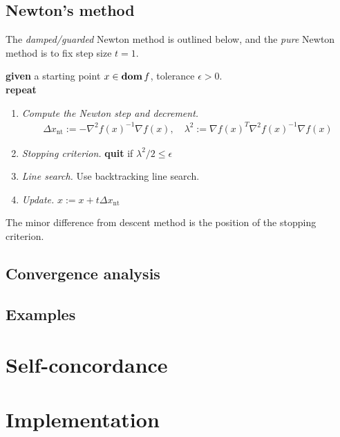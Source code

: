 \subsection{Newton's method}
The \textit{damped/guarded} Newton method is outlined below, and the \textit{pure} Newton method is to fix step size $t=1$.
\begin{algorithm}
  $ $\\
  \textbf{given} a starting point $x\in\mathop{\bf dom} f$, tolerance $\epsilon>0$.\\
  \textbf{repeat}
  \begin{enumerate}
    \item \textit{Compute the Newton step and decrement.}
      \begin{align*}
        \Delta x_{\text{nt}}:=-\nabla^2f(x)^{-1}\nabla f(x),\quad\lambda^2:=\nabla f(x)^T\nabla^2f(x)^{-1}\nabla f(x)
      \end{align*}
    \item \textit{Stopping criterion.} \textbf{quit} if $\lambda^2/2\le\epsilon$
    \item \textit{Line search.} Use backtracking line search.
    \item \textit{Update.} $x:=x+t\Delta x_{\text{nt}}$
  \end{enumerate}
\end{algorithm}
The minor difference from descent method is the position of the stopping criterion.

\subsection{Convergence analysis}

\subsection{Examples}

\section{Self-concordance}

\section{Implementation}
